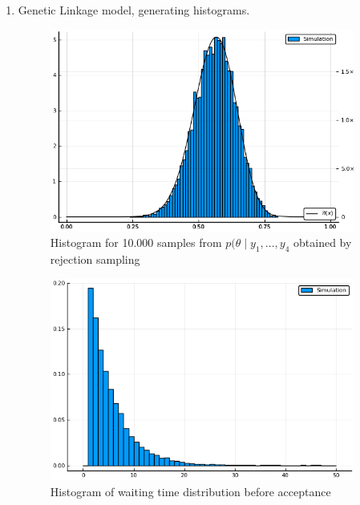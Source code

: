 \documentclass[12pt,letterpaper]{article}
\begin{document}
\begin{enumerate}[leftmargin=!,labelindent=5pt]
	\newpage
    \item Genetic Linkage model, generating histograms.
        \begin{figure}[H]
            \centering
            \includegraphics[width=10cm]{images/Ex3_1.png}
            \caption{Histogram for 10.000 samples from
            $p(\theta \mid y_1,...,y_4$ obtained by rejection sampling}
            \label{fig:3}
        \end{figure}

        \begin{figure}[H]
            \centering
            \includegraphics[width=10cm]{images/Ex3_2.png}
            \caption{Histogram of waiting time distribution before
            acceptance}
            \label{fig:4}
        \end{figure}


\end{enumerate}
\end{document}

